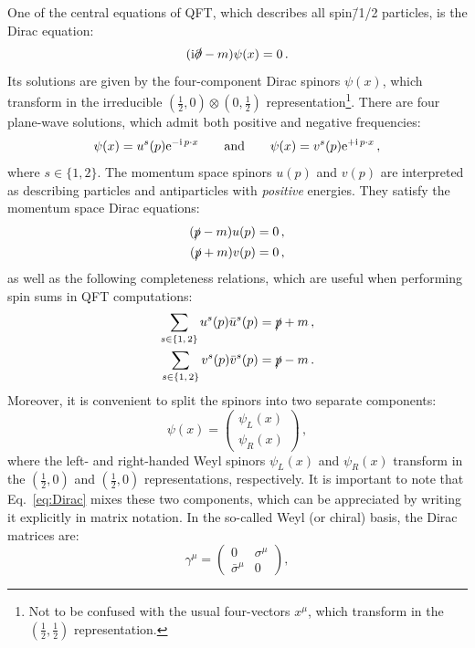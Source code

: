 \documentclass[main.tex]{subfiles}
\begin{document}
One of the central equations of QFT, which describes all spin\=/1/2 particles, is the Dirac equation:
\begin{equation} \label{eq:Dirac}
    (\mathrm{i} \slashed{\partial}-m)\psi(x) = 0\,.
\end{equation}
Its solutions are given by the four-component Dirac spinors $\psi(x)$, which transform in the irreducible $\left(\frac{1}{2}, 0\right) \otimes \left(0, \frac{1}{2}\right)$ representation\footnote{Not to be confused with the usual four-vectors $x^\mu$, which transform in the $\left(\frac{1}{2}, \frac{1}{2}\right)$ representation.}. There are four plane-wave solutions, which admit both positive and negative frequencies:
\begin{equation}
    \psi(x) = u^s(p)\mathrm{e}^{-\mathrm{i}\, p\cdot x} \qquad \text{and} \qquad \psi(x) = v^s(p)\mathrm{e}^{+\mathrm{i}\, p\cdot x}\,,
\end{equation}
where $s \in \{1, 2\}$. The momentum space spinors $u(p)$ and $v(p)$ are interpreted as describing particles and antiparticles with \textit{positive} energies. They satisfy the momentum space Dirac equations: 
\begin{align}
    (\slashed{p} - m)u(p) &= 0\,, \nonumber \\
    (\slashed{p} + m)v(p) &= 0\,,
\end{align}
as well as the following completeness relations, which are useful when performing spin sums in QFT computations:
\begin{align} \label{eq:completeness:fermions}
    \sum_{s \in \{1,\, 2\}} u^s(p)\bar{u}^s(p) &= \slashed{p} + m\, \nonumber, \\
    \sum_{s \in \{1,\, 2\}} v^s(p)\bar{v}^s(p) &= \slashed{p} - m\,.
\end{align}
Moreover, it is convenient to split the spinors into two separate components:
\begin{equation}
    \psi(x) = 
    \begin{pmatrix}
        \psi_L(x) \\
        \psi_R(x)
    \end{pmatrix}\,,
\end{equation}
where the left- and right-handed Weyl spinors $\psi_L(x)$ and $\psi_R(x)$ transform in the $\left(\frac{1}{2}, 0 \right)$ and $\left(\frac{1}{2}, 0 \right)$ representations, respectively. It is important to note that Eq.~\ref{eq:Dirac} mixes these two components, which can be appreciated by writing it explicitly in matrix notation. In the so-called Weyl (or chiral) basis, the Dirac matrices are:
\begin{equation}
    \gamma^\mu = 
    \begin{pmatrix}
        0 & \sigma^\mu \\
        \bar{\sigma}^\mu & 0
    \end{pmatrix},
\end{equation}
\end{document}

